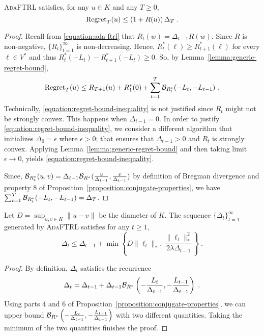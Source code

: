 \begin{lemma}
\label{lemma:initial-regret-bound}
\textsc{AdaFTRL} satisfies, for any $u \in K$ and any $T \ge 0$,
$$
\operatorname{Regret}_T(u) \le \left(1 + R(u) \right) \Delta_T \; .
$$
\end{lemma}

\begin{proof}
Recall from \eqref{equation:ada-ftrl} that $R_t(w) = \Delta_{t-1} R(w)$. Since $R$ is non-negative,
$\{R_t\}_{t=1}^\infty$ is non-decreasing.  Hence, $R_t^*(\ell) \ge
R_{t+1}^*(\ell)$ for every $\ell \in V^*$ and thus $R_t^*(-L_t) -
R_{t+1}^*(-L_t) \ge 0$.  So, by Lemma~\ref{lemma:generic-regret-bound},
\begin{equation}
\label{equation:regret-bound-inequality}
\operatorname{Regret}_T(u) \le R_{T+1}(u) + R_1^*(0) + \sum_{t=1}^{T} \mathcal{B}_{R_t^*}(-L_t, -L_{t-1}) \; .
\end{equation}
Technically, \eqref{equation:regret-bound-inequality} is not justified since
$R_t$ might not be strongly convex. This happens when $\Delta_{t-1} = 0$. In
order to justify \eqref{equation:regret-bound-inequality}, we consider a
different algorithm that initializes $\Delta_0 = \epsilon$ where $\epsilon >
0$; that ensures that $\Delta_{t-1} > 0$ and $R_t$ is strongly convex.
Applying  Lemma~\ref{lemma:generic-regret-bound} and then taking limit
$\epsilon \to 0$, yields \eqref{equation:regret-bound-inequality}.

Since, $\mathcal{B}_{R_t^*}(u,v) = \Delta_{t-1} \mathcal{B}_{R^*}(\frac{u}{\Delta_{t-1}},
\frac{v}{\Delta_{t-1}})$ by definition of Bregman divergence and property 8 of
Proposition~\ref{proposition:conjugate-properties}, we have $\sum_{t=1}^T
\mathcal{B}_{R_t^*}(-L_t, -L_{t-1}) = \Delta_T$.
\end{proof}

\begin{lemma}[Recurrence]
\label{lemma:gap-recurrence}
Let $D = \sup_{u, v \in K} \|u -v\|$ be the diameter of $K$.  The sequence
$\{\Delta_t\}_{t=1}^\infty$ generated by \textsc{AdaFTRL} satisfies for any $t
\ge 1$,
$$
\Delta_t \le \Delta_{t-1} + \min \left\{ D\|\ell_t\|_*, \ \frac{\|\ell_t\|_*^2}{2\lambda \Delta_{t-1}} \right\} \; .
$$
\end{lemma}

\begin{proof}
By definition, $\Delta_t$ satisfies the recurrence
$$
\Delta_t = \Delta_{t-1} + \Delta_{t-1} \mathcal{B}_{R^*}\left( - \frac{L_t}{\Delta_{t-1}}, - \frac{L_{t-1}}{\Delta_{t-1}} \right) \; .
$$
Using parts 4 and 6 of Proposition~\ref{proposition:conjugate-properties}, we
can upper bound $\mathcal{B}_{R^*}\left( - \frac{L_t}{\Delta_{t-1}}, -
\frac{L_{t-1}}{\Delta_{t-1}} \right)$ with two different quantities.  Taking the
minimum of the two quantities finishes the proof.
\end{proof}

